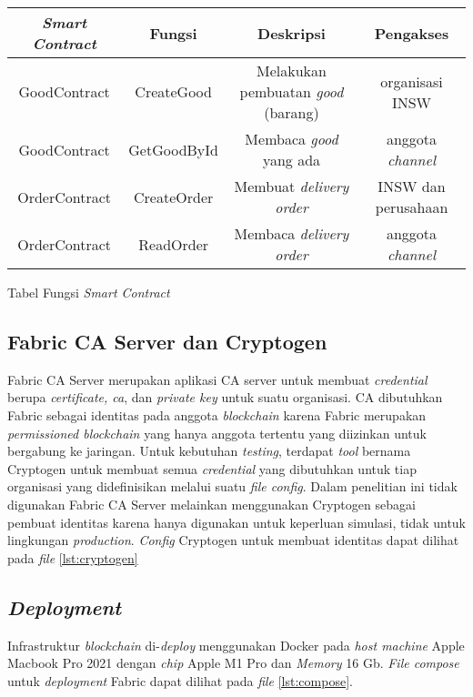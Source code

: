 \begin{center}
\begin{tabular}{ |c|c|c|c| } 
 \hline
 \textit{\textbf{Smart Contract}} & \textbf{Fungsi} & \textbf{Deskripsi} & \textbf{Pengakses} \\ 
 \hline
 GoodContract & CreateGood & Melakukan pembuatan \textit{good} (barang) & organisasi INSW \\ 
 \hline
 GoodContract & GetGoodById & Membaca \textit{good} yang ada & anggota \textit{channel} \\ 
 \hline
 OrderContract & CreateOrder & Membuat \textit{delivery order} & INSW dan perusahaan \\
 \hline
 OrderContract & ReadOrder & Membaca \textit{delivery order} & anggota \textit{channel} \\
 \hline
\end{tabular}
\caption{Tabel Fungsi \textit{Smart Contract}}
\label{table:smartcontract}
\end{center}

\subsection{Fabric CA Server dan Cryptogen}
\label{subsec:fabric-ca}
Fabric CA Server merupakan aplikasi CA server untuk membuat \textit{credential} berupa \textit{certificate, ca}, dan \textit{private key} untuk suatu organisasi. CA dibutuhkan Fabric sebagai identitas pada anggota \textit{blockchain} karena Fabric merupakan \textit{permissioned blockchain} yang hanya anggota tertentu yang diizinkan untuk bergabung ke jaringan. Untuk kebutuhan \textit{testing}, terdapat \textit{tool} bernama Cryptogen untuk membuat semua \textit{credential} yang dibutuhkan untuk tiap organisasi yang didefinisikan melalui suatu \textit{file config}. Dalam penelitian ini tidak digunakan Fabric CA Server melainkan menggunakan Cryptogen sebagai pembuat identitas karena hanya digunakan untuk keperluan simulasi, tidak untuk lingkungan \textit{production}. \textit{Config} Cryptogen untuk membuat identitas dapat dilihat pada \textit{file} \ref{lst:cryptogen} 



\subsection{\textit{Deployment}}
\label{subsec:deployment}
Infrastruktur \textit{blockchain} di-\textit{deploy} menggunakan Docker pada \textit{host machine} Apple Macbook Pro 2021 dengan \textit{chip} Apple M1 Pro dan \textit{Memory} 16 Gb. \textit{File compose} untuk \textit{deployment} Fabric dapat dilihat pada \textit{file} \ref{lst:compose}.

